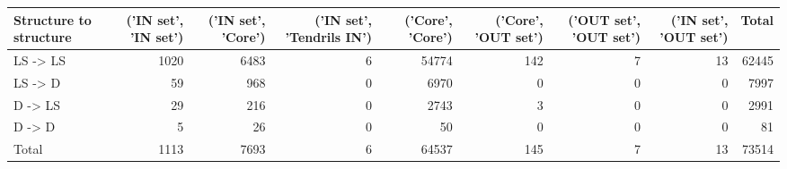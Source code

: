 \begin{tabular}{lrrrrrrrr}
\toprule
Structure to structure & ('IN set', 'IN set') & ('IN set', 'Core') & ('IN set', 'Tendrils IN') & ('Core', 'Core') & ('Core', 'OUT set') & ('OUT set', 'OUT set') & ('IN set', 'OUT set') & Total \\
\midrule
LS -> LS & 1020 & 6483 & 6 & 54774 & 142 & 7 & 13 & 62445 \\
LS -> D & 59 & 968 & 0 & 6970 & 0 & 0 & 0 & 7997 \\
D -> LS & 29 & 216 & 0 & 2743 & 3 & 0 & 0 & 2991 \\
D -> D & 5 & 26 & 0 & 50 & 0 & 0 & 0 & 81 \\
Total & 1113 & 7693 & 6 & 64537 & 145 & 7 & 13 & 73514 \\
\bottomrule
\end{tabular}
